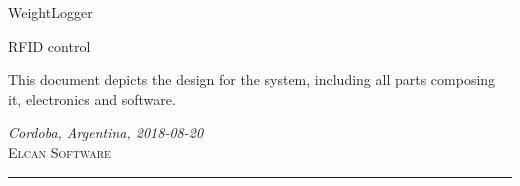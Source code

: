 \documentclass[a4paper]{article}
\author{%
	Mario O. Villarroel \\
	System Design/Developer\\
	\texttt{movilla@elcansoftware.com}\vspace{20pt} \\
	Pablo Giachero\\
	Product Owner\\
	\texttt{pgiachero@elcansoftware.com}
}
\def\documentdate{Cordoba, Argentina, 2018-08-20}
\begin{document}
	\begin{titlepage}
		\noindent
		\titlefont WeightLogger\par
		\vspace*{15pt}
		\subtitlefont RFID control\par
		\epigraph{This document depicts the design for the system, including all parts composing it, electronics and software.}%
		{\textit{\documentdate}\\ \textsc{Elcan Software}}
		\null\vfill
		\vspace*{1cm}
		\noindent
		\hfill
		\begin{minipage}{0.50\linewidth}
		    \begin{flushright}
		        \printauthor
		    \end{flushright}
		\end{minipage}
		\begin{minipage}{0.02\linewidth}
		    \rule{1pt}{125pt}
		\end{minipage}
		\titlepagedecoration
	\end{titlepage}
	
	
\end{document}
